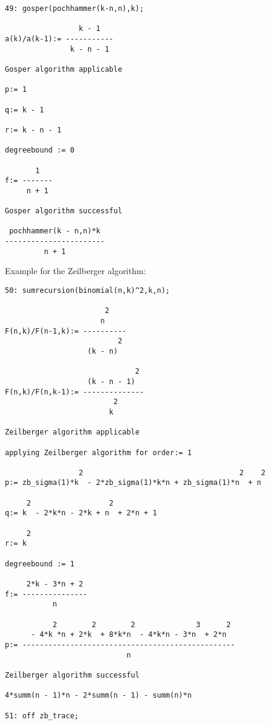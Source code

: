 {\small
\begin{verbatim}
49: gosper(pochhammer(k-n,n),k);

                 k - 1
a(k)/a(k-1):= -----------
               k - n - 1

Gosper algorithm applicable

p:= 1

q:= k - 1

r:= k - n - 1

degreebound := 0

       1
f:= -------
     n + 1

Gosper algorithm successful

 pochhammer(k - n,n)*k
-----------------------
         n + 1
\end{verbatim}
}
Example for the Zeilberger algorithm:
{\small%
\begin{verbatim}
50: sumrecursion(binomial(n,k)^2,k,n);

                       2
                      n
F(n,k)/F(n-1,k):= ----------
                          2
                   (k - n)

                              2
                   (k - n - 1)
F(n,k)/F(n,k-1):= --------------
                         2
                        k

Zeilberger algorithm applicable

applying Zeilberger algorithm for order:= 1

                 2                                    2    2
p:= zb_sigma(1)*k  - 2*zb_sigma(1)*k*n + zb_sigma(1)*n  + n

     2                  2
q:= k  - 2*k*n - 2*k + n  + 2*n + 1

     2
r:= k

degreebound := 1

     2*k - 3*n + 2
f:= ---------------
           n

           2        2        2              3      2
      - 4*k *n + 2*k  + 8*k*n  - 4*k*n - 3*n  + 2*n
p:= -------------------------------------------------
                            n

Zeilberger algorithm successful

4*summ(n - 1)*n - 2*summ(n - 1) - summ(n)*n

51: off zb_trace;
\end{verbatim}
}\noindent

